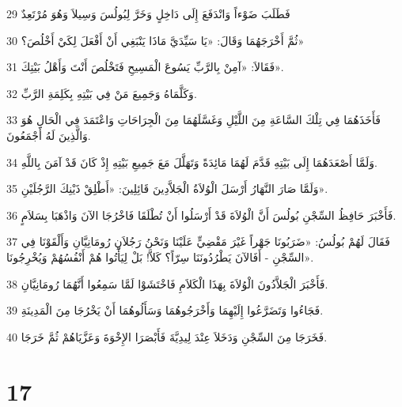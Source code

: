 \par 29 فَطَلَبَ ضَوْءاً وَانْدَفَعَ إِلَى دَاخِلٍ وَخَرَّ لِبُولُسَ وَسِيلاَ وَهُوَ مُرْتَعِدٌ
\par 30 ثُمَّ أَخْرَجَهُمَا وَقَالَ: «يَا سَيِّدَيَّ مَاذَا يَنْبَغِي أَنْ أَفْعَلَ لِكَيْ أَخْلُصَ؟»
\par 31 فَقَالاَ: «آمِنْ بِالرَّبِّ يَسُوعَ الْمَسِيحِ فَتَخْلُصَ أَنْتَ وَأَهْلُ بَيْتِكَ».
\par 32 وَكَلَّمَاهُ وَجَمِيعَ مَنْ فِي بَيْتِهِ بِكَلِمَةِ الرَّبِّ.
\par 33 فَأَخَذَهُمَا فِي تِلْكَ السَّاعَةِ مِنَ اللَّيْلِ وَغَسَّلَهُمَا مِنَ الْجِرَاحَاتِ وَاعْتَمَدَ فِي الْحَالِ هُوَ وَالَّذِينَ لَهُ أَجْمَعُونَ.
\par 34 وَلَمَّا أَصْعَدَهُمَا إِلَى بَيْتِهِ قَدَّمَ لَهُمَا مَائِدَةً وَتَهَلَّلَ مَعَ جَمِيعِ بَيْتِهِ إِذْ كَانَ قَدْ آمَنَ بِاللَّهِ.
\par 35 وَلَمَّا صَارَ النَّهَارُ أَرْسَلَ الْوُلاَةُ الْجَلاَّدِينَ قَائِلِينَ: «أَطْلِقْ ذَيْنِكَ الرَّجُلَيْنِ».
\par 36 فَأَخْبَرَ حَافِظُ السِّجْنِ بُولُسَ أَنَّ الْوُلاَةَ قَدْ أَرْسَلُوا أَنْ تُطْلَقَا فَاخْرُجَا الآنَ وَاذْهَبَا بِسَلاَمٍ.
\par 37 فَقَالَ لَهُمْ بُولُسُ: «ضَرَبُونَا جَهْراً غَيْرَ مَقْضِيٍّ عَلَيْنَا وَنَحْنُ رَجُلاَنِ رُومَانِيَّانِ وَأَلْقَوْنَا فِي السِّجْنِ - أَفَالآنَ يَطْرُدُونَنَا سِرّاً؟ كَلاَّ! بَلْ لِيَأْتُوا هُمْ أَنْفُسُهُمْ وَيُخْرِجُونَا».
\par 38 فَأَخْبَرَ الْجَلاَّدُونَ الْوُلاَةَ بِهَذَا الْكَلاَمِ فَاخْتَشَوْا لَمَّا سَمِعُوا أَنَّهُمَا رُومَانِيَّانِ.
\par 39 فَجَاءُوا وَتَضَرَّعُوا إِلَيْهِمَا وَأَخْرَجُوهُمَا وَسَأَلُوهُمَا أَنْ يَخْرُجَا مِنَ الْمَدِينَةِ.
\par 40 فَخَرَجَا مِنَ السِّجْنِ وَدَخَلاَ عِنْدَ لِيدِيَّةَ فَأَبْصَرَا الإِخْوَةَ وَعَزَّيَاهُمْ ثُمَّ خَرَجَا.

\chapter{17}

